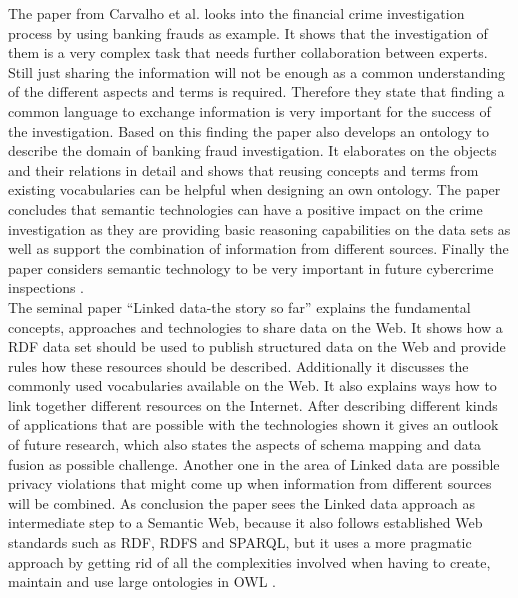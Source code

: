 The paper from Carvalho et al. looks into the financial crime investigation process by using banking frauds as example. It shows that the investigation of them is a very complex task that needs further collaboration between experts. Still just sharing the information will not be enough as a common understanding of the different aspects and terms is required. Therefore they state that finding a common language to exchange information is very important for the success of the investigation. Based on this finding the paper also develops an ontology to describe the domain of banking fraud investigation. It elaborates on the objects and their relations in detail and shows that reusing concepts and terms from existing vocabularies can be helpful when designing an own ontology. The paper concludes that semantic technologies can have a positive impact on the crime investigation as they are providing basic reasoning capabilities on the data sets as well as support the combination of information from different sources. Finally the paper considers semantic technology to be very important in future cybercrime inspections \citep{carvalhoapplying}. \\

The seminal paper ``Linked data-the story so far'' explains the fundamental concepts, approaches and technologies to share data on the Web. It shows how a \gls{RDF} data set should be used to publish structured data on the Web and provide rules how these resources should be described. Additionally it discusses the commonly used vocabularies available on the Web. It also explains ways how to link together different resources on the Internet. After describing different kinds of applications that are possible with the technologies shown it gives an outlook of future research, which also states the aspects of schema mapping and data fusion as possible challenge. Another one in the area of Linked data are possible privacy violations that might come up when information from different sources will be combined. As conclusion the paper sees the Linked data approach as intermediate step to a Semantic Web, because it also follows established Web standards such as \gls{RDF}, \gls{RDFS} and \gls{SPARQL}, but it uses a more pragmatic approach by getting rid of all the complexities involved when having to create, maintain and use large ontologies in \gls{OWL} \citep{bizer2009linked}. \\

